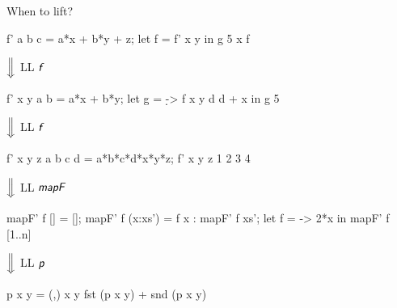 \documentclass{haskellbeamer}
\newcommand{\id}[1]{\textsf{\textsl{#1}}\xspace}
\newcommand{\idf}{\id{f}}
\begin{document}
\begin{frame}[fragile]{When to lift?}
\begin{center}
\begin{minipage}{0.55\textwidth}
\begin{overprint}
        \begin{haskell}
          f' a b c = a*x + b*y + z;
          let f = f' x y
          in g 5 x f
        \end{haskell}
        \hspace{0.4\textwidth}$\Big\Downarrow$ LL $\idf$
        \begin{haskell}
          f' x y a b = a*x + b*y;
          let g = \d -> f x y d d + x
          in g 5
        \end{haskell}
        \hspace{0.4\textwidth}$\Big\Downarrow$ LL $\idf$
        \begin{haskell}
          f' x y z a b c d = a*b*c*d*x*y*z;
          f' x y z 1 2 3 4
        \end{haskell}
        \hspace{0.4\textwidth}$\Big\Downarrow$ LL $\id{mapF}$
        \begin{haskell}
          mapF' f []      = [];
          mapF' f (x:xs') = f x : mapF' f xs';
          let f = \x -> 2*x
          in mapF' f [1..n]
        \end{haskell}
        \hspace{0.4\textwidth}$\Big\Downarrow$ LL $\id{p}$
        \begin{haskell}
          p x y = (,) x y
          fst (p x y) + snd (p x y)
        \end{haskell}
      \end{overprint}
    \end{minipage}
  \end{center}
\end{frame}
\end{document}
